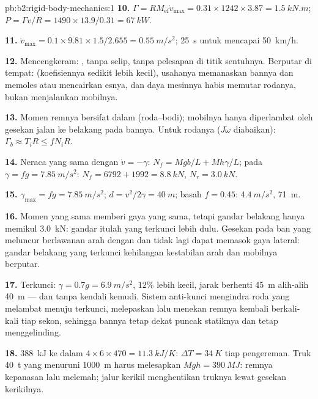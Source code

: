 \begin{solution}{pb:b2:rigid-body-mechanics:1}
\textbf{10.} $\Gamma = RM_{\text{ef}}\dot v_{\max} = 0.31 \times 1242 \times 3.87 =
\qty{1.5}{kN.m}$; $P = \Gamma v/R = 1490 \times 13.9/0.31 = \qty{67}{kW}$.

\textbf{11.} $\dot v_{\max} = 0.1 \times 9.81 \times 1.5/2.655 = \qty{0.55}{m/s^2}$;
\qty{25}{s} untuk mencapai \qty{50}{km/h}.

\textbf{12.} Mencengkeram: , tanpa selip, tanpa
pelesapan di titik sentuhnya. Berputar di tempat: 
(koefisiennya sedikit lebih kecil), usahanya memanaskan bannya dan
memoles atau mencairkan esnya, dan daya mesinnya habis memutar rodanya,
bukan menjalankan mobilnya.

\textbf{13.} Momen remnya bersifat dalam (roda--bodi); mobilnya hanya
diperlambat oleh gesekan jalan ke belakang pada bannya. Untuk rodanya
($J\dot\omega$ diabaikan): $\Gamma_b \approx T_iR \le fN_iR$.

\textbf{14.} Neraca yang sama dengan $\dot v = -\gamma$: $N_f = Mgb/L + Mh\gamma/L$;
pada $\gamma = fg = \qty{7.85}{m/s^2}$: $N_f = 6792 + 1992 = \qty{8.8}{kN}$, $N_r =
\qty{3.0}{kN}$.

\textbf{15.} $\gamma_{\max} = fg = \qty{7.85}{m/s^2}$; $d = v^2/2\gamma = \qty{40}{m}$;
basah $f = 0.45$: $\qty{4.4}{m/s^2}$, \qty{71}{m}.

\textbf{16.} Momen yang sama memberi gaya yang sama, tetapi gandar
belakang hanya memikul \qty{3.0}{kN}: gandar itulah yang terkunci lebih
dulu. Gesekan pada ban yang meluncur berlawanan arah dengan
 dan tidak lagi dapat memasok gaya lateral:
gandar belakang yang terkunci kehilangan kestabilan arah dan mobilnya berputar.

\textbf{17.} Terkunci: $\gamma = 0.7g = \qty{6.9}{m/s^2}$, $12\%$ lebih
kecil, jarak berhenti \qty{45}{m} alih-alih \qty{40}{m} --- dan tanpa
kendali kemudi. Sistem anti-kunci mengindra roda yang melambat menuju
terkunci, melepaskan lalu menekan remnya kembali berkali-kali tiap
sekon, sehingga bannya tetap dekat puncak statiknya dan tetap menggelinding.

\textbf{18.} \qty{388}{kJ} ke dalam $4 \times 6 \times 470 = \qty{11.3}{kJ/K}$: $\Delta T =
\qty{34}{K}$ tiap pengereman. Truk \qty{40}{t} yang menuruni \qty{1000}{m} harus melesapkan
$Mgh = \qty{390}{MJ}$: remnya kepanasan lalu melemah; jalur kerikil
menghentikan truknya lewat gesekan kerikilnya.


\end{solution}
